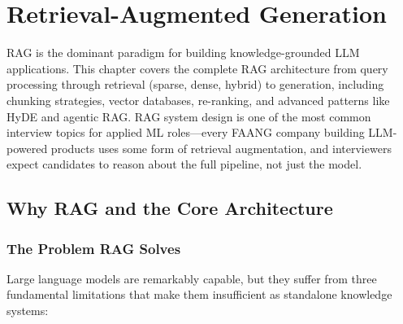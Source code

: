 
\chapter{Retrieval-Augmented Generation}
\label{chap:rag}

\begin{tldr}
RAG is the dominant paradigm for building knowledge-grounded LLM applications.
This chapter covers the complete RAG architecture from query processing through
retrieval (sparse, dense, hybrid) to generation, including chunking strategies,
vector databases, re-ranking, and advanced patterns like HyDE and agentic RAG.
RAG system design is one of the most common interview topics for applied ML
roles---every FAANG company building LLM-powered products uses some form of
retrieval augmentation, and interviewers expect candidates to reason about the
full pipeline, not just the model.
\end{tldr}

\bigskip

\section{Why RAG and the Core Architecture}
\label{sec:rag-overview}

\subsection{The Problem RAG Solves}

Large language models are remarkably capable, but they suffer from three
fundamental limitations that make them insufficient as standalone knowledge
systems:


